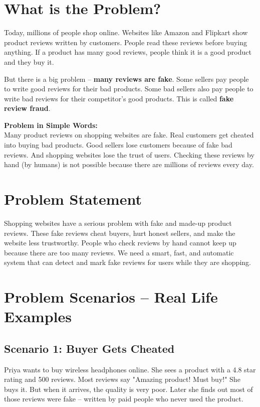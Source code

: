 \documentclass[10pt, a4paper]{report}
\begin{document}
\section{What is the Problem?}

Today, millions of people shop online. Websites like Amazon and Flipkart show product reviews written by customers. People read these reviews before buying anything. If a product has many good reviews, people think it is a good product and they buy it.

But there is a big problem -- \textbf{many reviews are fake}. Some sellers pay people to write good reviews for their bad products. Some bad sellers also pay people to write bad reviews for their competitor's good products. This is called \textbf{fake review fraud}.

\begin{bluebox}
\textbf{Problem in Simple Words:}\\
Many product reviews on shopping websites are fake. Real customers get cheated into buying bad products. Good sellers lose customers because of fake bad reviews. And shopping websites lose the trust of users. Checking these reviews by hand (by humans) is not possible because there are millions of reviews every day.
\end{bluebox}

\section{Problem Statement}

Shopping websites have a serious problem with fake and made-up product reviews. These fake reviews cheat buyers, hurt honest sellers, and make the website less trustworthy. People who check reviews by hand cannot keep up because there are too many reviews. We need a smart, fast, and automatic system that can detect and mark fake reviews for users while they are shopping.

\section{Problem Scenarios -- Real Life Examples}

\subsection{Scenario 1: Buyer Gets Cheated}

Priya wants to buy wireless headphones online. She sees a product with a 4.8 star rating and 500 reviews. Most reviews say "Amazing product! Must buy!" She buys it. But when it arrives, the quality is very poor. Later she finds out most of those reviews were fake -- written by paid people who never used the product.
\end{document}
